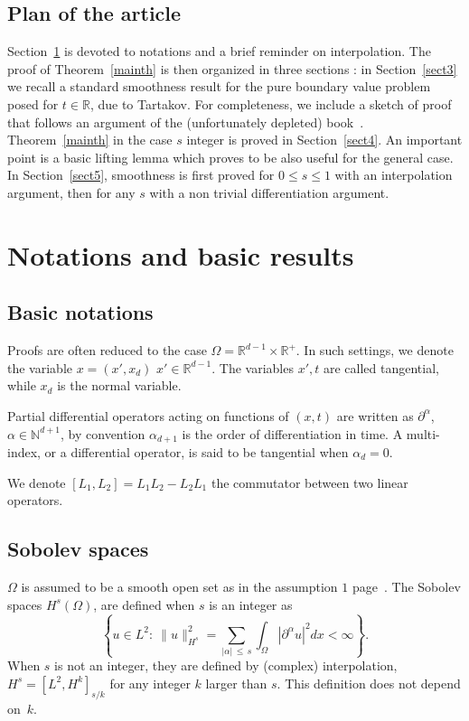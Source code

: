 \documentclass[10pt]{amsart}
\theoremstyle{definition}\newtheorem{defi}[theo]{Definition}\newtheorem{rema}[theo]{Remark}\newtheorem{exam}[theo]{Example}\newtheorem{exem}[theo]{Example}\newtheorem{nota}[theo]{Notation}
\newcommand{\R}{\mathbb{R}}
\newcommand{\N}{\mathbb{N}}
\begin{document}
\subsection{Plan of the article}
Section~\ref{notations} is devoted to notations and a brief reminder on interpolation. The proof of Theorem~\ref{mainth} is then organized in three sections : in Section~\ref{sect3} we recall a standard smoothness result for the pure boundary value problem posed for $t\in \R$, due to Tartakov. For completeness, we include a sketch of proof that follows an argument of the (unfortunately depleted) book~\cite{ChaPi}. Theorem~\ref{mainth} in the case $s$ integer is proved in Section~\ref{sect4}. An important point is a basic lifting lemma which proves to be also useful for the general case. In Section~\ref{sect5}, smoothness is first proved for $0\leq s\leq 1$ with an interpolation argument, then for any $s$ with a non trivial differentiation argument.



\section{Notations and basic results}\label{notations}

\subsection{Basic notations}
Proofs are often reduced to the case $\Omega=\R^{d-1}\times \R^+$. In such settings, we denote the variable $x=(x',x_d)$ $x'\in \R^{d-1}$. The variables $x',t$ are called tangential, while $x_d$ is the normal variable. 


Partial differential operators acting on functions of $(x,t)$ are written as $\partial^\alpha$, $\alpha\in \N^{d+1}$, by convention $\alpha_{d+1}$ is the order of differentiation in time. A multi-index, or a differential operator, is said to be tangential when $\alpha_d=0$.


We denote $[L_1,L_2]=L_1L_2-L_2L_1$ the commutator between two linear operators.

\subsection{Sobolev spaces}
$\Omega$ is assumed to be a smooth open set as in the assumption $1$ page~\pageref{assump1}. The Sobolev spaces $H^s(\Omega)$, are defined when $s$ is an integer as
\[
\left\{u\in L^2:\ \|u\|_{H^s}^2=
\sum_{|\alpha|\,\leq\,s}\int_\Omega|\partial^\alpha u|^2dx<\infty\right\}.
\]
When $s$ is not an integer, they are defined by (complex) interpolation, $H^s=[L^2,H^k]_{s/k}$ for any integer $k$ larger than $s$. This definition does not depend on~$k$.
\end{document}
